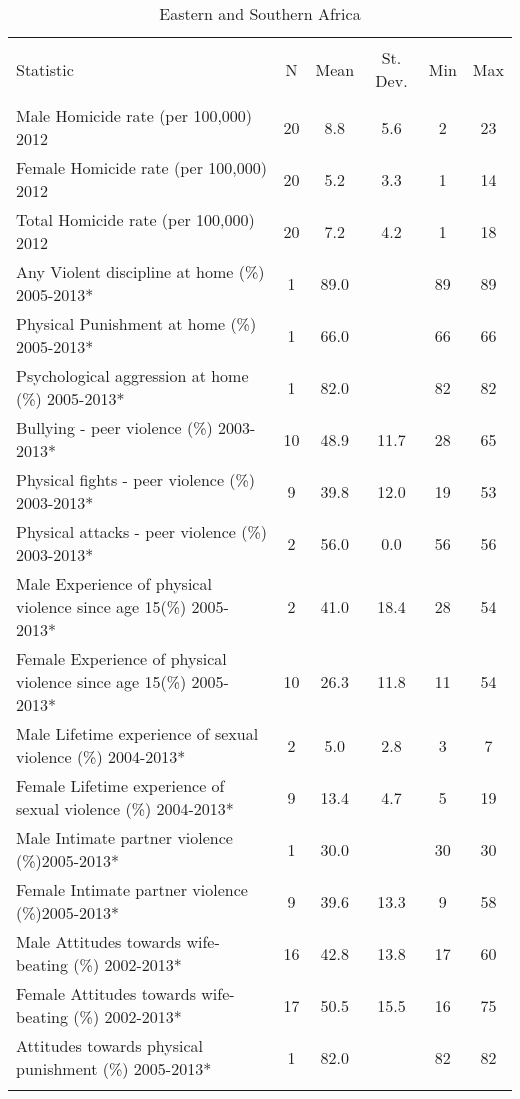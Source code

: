 
\begin{table}[!htbp] \centering 
  \caption{Eastern and Southern Africa} 
  \label{} 
\begin{tabular}{@{\extracolsep{5pt}}lccccc} 
\\[-1.8ex]\hline 
\hline \\[-1.8ex] 
Statistic & \multicolumn{1}{c}{N} & \multicolumn{1}{c}{Mean} & \multicolumn{1}{c}{St. Dev.} & \multicolumn{1}{c}{Min} & \multicolumn{1}{c}{Max} \\ 
\hline \\[-1.8ex] 
Male Homicide rate (per 100,000) 2012 & 20 & 8.8 & 5.6 & 2 & 23 \\ 
Female Homicide rate (per 100,000)  2012 & 20 & 5.2 & 3.3 & 1 & 14 \\ 
Total Homicide rate (per 100,000)  2012 & 20 & 7.2 & 4.2 & 1 & 18 \\ 
Any Violent discipline at home (\%) 2005-2013* & 1 & 89.0 &  & 89 & 89 \\ 
Physical Punishment at home (\%) 2005-2013* & 1 & 66.0 &  & 66 & 66 \\ 
Psychological aggression at home (\%) 2005-2013* & 1 & 82.0 &  & 82 & 82 \\ 
Bullying - peer violence (\%) 2003-2013* & 10 & 48.9 & 11.7 & 28 & 65 \\ 
Physical fights - peer violence (\%) 2003-2013* & 9 & 39.8 & 12.0 & 19 & 53 \\ 
Physical attacks - peer violence (\%) 2003-2013* & 2 & 56.0 & 0.0 & 56 & 56 \\ 
Male Experience of physical violence since age 15(\%) 2005-2013* & 2 & 41.0 & 18.4 & 28 & 54 \\ 
Female Experience of physical violence since age 15(\%) 2005-2013* & 10 & 26.3 & 11.8 & 11 & 54 \\ 
Male Lifetime experience of sexual violence (\%) 2004-2013* & 2 & 5.0 & 2.8 & 3 & 7 \\ 
Female Lifetime experience of sexual violence (\%) 2004-2013* & 9 & 13.4 & 4.7 & 5 & 19 \\ 
Male Intimate partner violence (\%)2005-2013* & 1 & 30.0 &  & 30 & 30 \\ 
Female Intimate partner violence (\%)2005-2013* & 9 & 39.6 & 13.3 & 9 & 58 \\ 
Male Attitudes towards wife-beating (\%) 2002-2013* & 16 & 42.8 & 13.8 & 17 & 60 \\ 
Female Attitudes towards wife-beating (\%) 2002-2013* & 17 & 50.5 & 15.5 & 16 & 75 \\ 
Attitudes towards physical punishment (\%) 2005-2013* & 1 & 82.0 &  & 82 & 82 \\ 
\hline \\[-1.8ex] 
\end{tabular} 
\end{table} 
